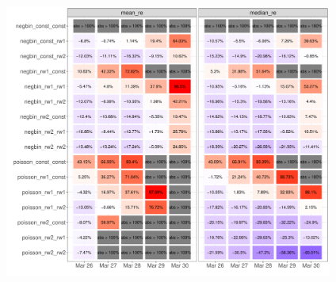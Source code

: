 \documentclass[usenames,dvipsnames]{beamer}
\begin{document}
{
\begin{frame}[plain]
\end{frame}
}

\begin{frame}
\begin{figure}
 \begin{center}
  \includegraphics[height = 9cm]{figures/mdiff_hold_italy.pdf}
 \end{center}
\end{figure}
\end{frame}
\end{document}
